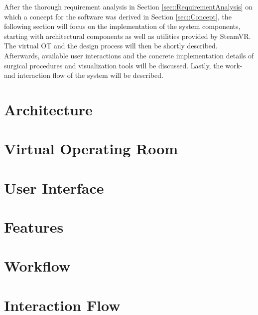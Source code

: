After the thorough requirement analysis in Section \ref{sec::RequirementAnalysis} on which a concept for the software was derived in Section \ref{sec::Concept}, 
the following section will focus on the implementation of the system components, starting with architectural components as well as utilities provided by SteamVR.
The virtual OT and the design process will then be shortly described.
Afterwards, available user interactions and the concrete implementation details of surgical procedures and visualization tools will be discussed.
Lastly, the work- and interaction flow of the system will be described.

\section{\label{sec::Architecture}Architecture}

\section{\label{sec::VirtualOperatingRoom}Virtual Operating Room}

\section{\label{sec::UserInterface}User Interface}

\section{\label{sec::Features}Features}

\section{\label{sec::Workflow}Workflow}

\section{\label{sec::InteractionFlow}Interaction Flow}
